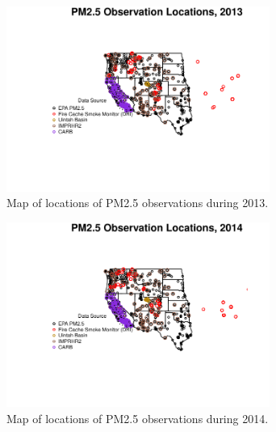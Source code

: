 \begin{figure} 
\centering 
\includegraphics[width=0.77\textwidth]{Code_Outputs/MapPM25_All_Sitesplot_year2013.pdf} 
\caption{\label{fig:MapPM25Loc2013}Map of locations of PM2.5 observations during 2013.} 
\end{figure} 
 

\begin{figure} 
\centering 
\includegraphics[width=0.77\textwidth]{Code_Outputs/MapPM25_All_Sitesplot_year2014.pdf} 
\caption{\label{fig:MapPM25Loc2014}Map of locations of PM2.5 observations during 2014.} 
\end{figure} 
 
